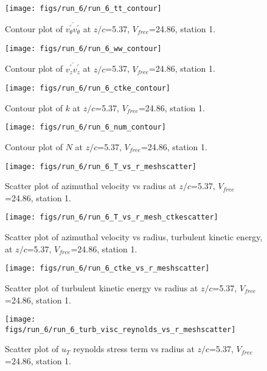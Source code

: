 \begin{figure}[H]
\centering
\texttt{[image: figs/run\_6/run\_6\_tt\_contour]}
\caption{Contour plot of $\overline{v_{\theta}^{\prime} v_{\theta}^{\prime}}$ at $z/c$=5.37, $V_{free}$=24.86, station 1.}
\end{figure}


\begin{figure}[H]
\centering
\texttt{[image: figs/run\_6/run\_6\_ww\_contour]}
\caption{Contour plot of $\overline{v_{z}^{\prime} v_{z}^{\prime}}$ at $z/c$=5.37, $V_{free}$=24.86, station 1.}
\end{figure}


\begin{figure}[H]
\centering
\texttt{[image: figs/run\_6/run\_6\_ctke\_contour]}
\caption{Contour plot of $k$ at $z/c$=5.37, $V_{free}$=24.86, station 1.}
\end{figure}


\begin{figure}[H]
\centering
\texttt{[image: figs/run\_6/run\_6\_num\_contour]}
\caption{Contour plot of $N$ at $z/c$=5.37, $V_{free}$=24.86, station 1.}
\end{figure}


\begin{figure}[H]
\centering
\texttt{[image: figs/run\_6/run\_6\_T\_vs\_r\_meshscatter]}
\caption{Scatter plot of azimuthal velocity vs radius at $z/c$=5.37, $V_{free}$=24.86, station 1.}
\end{figure}


\begin{figure}[H]
\centering
\texttt{[image: figs/run\_6/run\_6\_T\_vs\_r\_mesh\_ctkescatter]}
\caption{Scatter plot of azimuthal velocity vs radius, turbulent kinetic energy, at $z/c$=5.37, $V_{free}$=24.86, station 1.}
\end{figure}


\begin{figure}[H]
\centering
\texttt{[image: figs/run\_6/run\_6\_ctke\_vs\_r\_meshscatter]}
\caption{Scatter plot of turbulent kinetic energy vs radius at $z/c$=5.37, $V_{free}$=24.86, station 1.}
\end{figure}


\begin{figure}[H]
\centering
\texttt{[image: figs/run\_6/run\_6\_turb\_visc\_reynolds\_vs\_r\_meshscatter]}
\caption{Scatter plot of $
u_T$ reynolds stress term vs radius at $z/c$=5.37, $V_{free}$=24.86, station 1.}
\end{figure}


